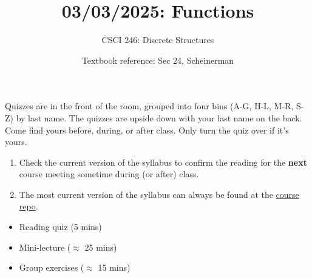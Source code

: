 \documentclass[10pt]{beamer}
\begin{document}






\title{03/03/2025: Functions}
\author{CSCI 246: Discrete Structures}
\date{Textbook reference: Sec 24, Scheinerman}

\begin{frame}
    \titlepage 
\end{frame}


\begin{frame}
\footnotesize 
\begin{mygreenbox}[title=Graded Quiz Pickup]
Quizzes are in the front of the room, grouped into four bins (A-G, H-L, M-R, S-Z) by last name. The quizzes are upside down with your last name on the back. Come find yours before, during, or after class.  Only turn the quiz over if it's yours.
\end{mygreenbox} 
\vfill 

\begin{myredbox}[title=Announcement: How to be sure you're reading the right section]
\begin{enumerate}
	\item Check the current version of the syllabus to confirm the reading for the \textbf{next} course meeting sometime during (or after) class.  
	\item The most current version of the syllabus can always be found at the \href{https://github.com/mikewojnowicz/csci246_spring2025}{course repo}.  
\end{enumerate}
\end{myredbox}

\vfill 


\begin{myyellowbox}[title=Today's Agenda]
\begin{itemize}
	\item Reading quiz (5 mins)
	\item Mini-lecture ($\approx$ 25 mins)
	\item Group exercises ($\approx$ 15 mins)
\end{itemize}

%	
\end{myyellowbox}
\vfill 

\end{frame}
\end{document}
